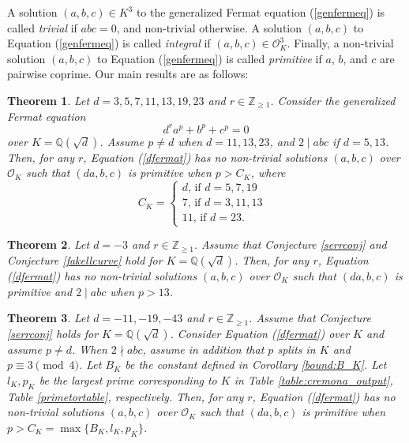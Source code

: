 \documentclass[]{article}
\newtheorem{theorem}{Theorem}
\newcommand {\ZZ}{{\mathbb{Z}}}
\newcommand {\QQ}{{\mathbb{Q}}}
\newcommand {\mcalO}{{\mathcal{O}}}
\begin{document}
A solution $(a, b, c) \in K^3$ to the generalized Fermat equation (\ref{genfermeq}) is called \textit{trivial} if $abc = 0$, and non-trivial otherwise. A solution $(a, b, c)$ to Equation (\ref{genfermeq}) is called \textit{integral} if $(a, b, c) \in \mcalO_K^3$. Finally, a non-trivial solution $(a, b, c)$ to Equation (\ref{genfermeq}) is called \textit{primitive} if $a$, $b$, and $c$ are pairwise coprime. Our main results are as follows:

\begin{theorem}\label{mainthm1}
Let $d=3,5,7,11,13,19,23$ and $r\in\ZZ_{\ge 1}$. Consider the generalized Fermat equation 
\begin{equation}\label{dfermat}
 d^ra^p+b^p+c^p=0  
\end{equation}over $K=\QQ(\sqrt{d})$. Assume $p\ne d$ when $d=11,13,23$, and $2\mid abc$ if $d=5,13$. Then, for any $r$, Equation (\ref{dfermat}) has no non-trivial solutions $(a,b,c)$ over $\mcalO_K$ such that $(da,b,c)$ is primitive when $p>C_K$, where $$C_K=
\left\{\begin{array}{l}
d \text {, if $d=5,7,19$ } \\
7\text {, if $d=3,11,13$ }\\
11 \text {, if $d=23$. }
\end{array}\right.$$
\end{theorem}


\begin{theorem}\label{mainthm2:d=-3}
Let $d=-3$ and $r\in\ZZ_{\ge 1}$. Assume that Conjecture \ref{serrconj} and Conjecture \ref{fakellcurve} hold for $K=\QQ(\sqrt{d})$. Then, for any $r$, Equation (\ref{dfermat}) has no non-trivial solutions $(a,b,c)$ over $\mcalO_K$ such that $(da,b,c)$ is primitive and $2\mid abc$ when $p> 13$.    
\end{theorem}

\begin{theorem}\label{mainthm3}
Let $d=-11,-19,-43$ and $r\in\ZZ_{\ge 1}$. Assume that Conjecture \ref{serrconj} holds for $K=\QQ(\sqrt{d})$. Consider Equation (\ref{dfermat}) over $K$  and assume $p\ne d$. When $2\nmid abc$, assume in addition that $p$ splits in $K$ and $p\equiv3\pmod4$. Let $B_K$ be the constant defined in Corollary \ref{bound:B_K}. Let $l_K,p_K$ be the largest prime corresponding to $K$ in Table \ref{table:cremona_output}, Table \ref{primetortable}, respectively. Then, for any $r$, Equation (\ref{dfermat}) has no non-trivial solutions $(a,b,c)$ over $\mcalO_K$ such that $(da,b,c)$ is primitive when $p>C_K=\max\{B_K,l_K,p_K\}$.
\end{theorem}
\end{document}
